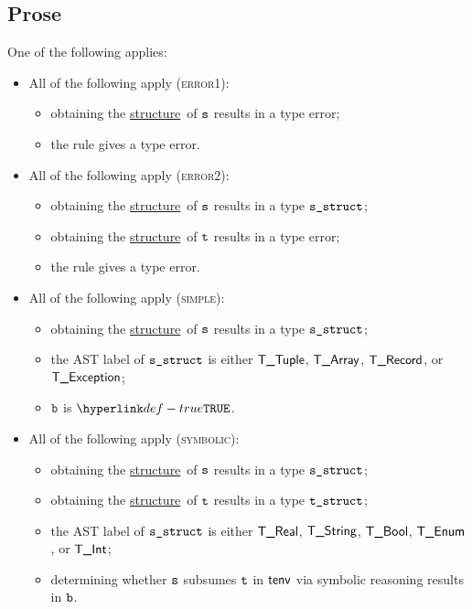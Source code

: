 \documentclass{book}
\newcommand\structure[0]{\hyperlink{def-structure}{structure}}
\begin{document}
\subsection{Prose}
One of the following applies:
\begin{itemize}
  \item All of the following apply (\textsc{error1}):
  \begin{itemize}
    \item obtaining the \structure\ of $\texttt{s}$ results in a type error;
    \item the rule gives a type error.
  \end{itemize}

  \item All of the following apply (\textsc{error2}):
  \begin{itemize}
    \item obtaining the \structure\ of $\texttt{s}$ results in a type $\texttt{s\_struct}$;
    \item obtaining the \structure\ of $\texttt{t}$ results in a type error;
    \item the rule gives a type error.
  \end{itemize}

  \item All of the following apply (\textsc{simple}):
  \begin{itemize}
    \item obtaining the \structure\ of $\texttt{s}$ results in a type $\texttt{s\_struct}$;
    \item the AST label of $\texttt{s\_struct}$ is either $\textsf{T\_Tuple}$, $\textsf{T\_Array}$, $\textsf{T\_Record}$, or $\textsf{T\_Exception}$;
    \item $\texttt{b}$ is $\True$.
  \end{itemize}

  \item All of the following apply (\textsc{symbolic}):
  \begin{itemize}
    \item obtaining the \structure\ of $\texttt{s}$ results in a type $\texttt{s\_struct}$;
    \item obtaining the \structure\ of $\texttt{t}$ results in a type $\texttt{t\_struct}$;
    \item the AST label of $\texttt{s\_struct}$ is either $\textsf{T\_Real}$, $\textsf{T\_String}$, $\textsf{T\_Bool}$, $\textsf{T\_Enum}$, or $\textsf{T\_Int}$;
    \item determining whether $\texttt{s}$ subsumes $\texttt{t}$ in $\textsf{tenv}$ via symbolic reasoning results in $\texttt{b}$.
  \end{itemize}
\end{itemize}
\end{document}
